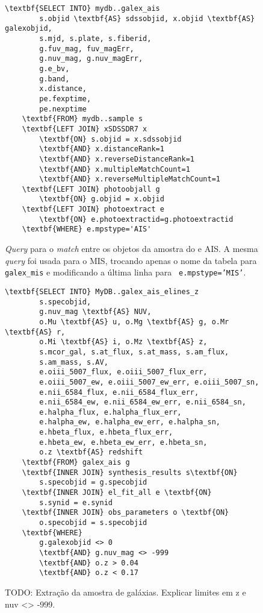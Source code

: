 \begin{figure}
	\begin{Verbatim}[commandchars=\\\{\}]
	\textbf{SELECT INTO} mydb..galex_ais
		s.objid \textbf{AS} sdssobjid, x.objid \textbf{AS} galexobjid,
		s.mjd, s.plate, s.fiberid,
		g.fuv_mag, fuv_magErr,
		g.nuv_mag, g.nuv_magErr,
		g.e_bv,
		g.band,
		x.distance,
		pe.fexptime,
		pe.nexptime
	\textbf{FROM} mydb..sample s
	\textbf{LEFT JOIN} xSDSSDR7 x
		\textbf{ON} s.objid = x.sdssobjid
		\textbf{AND} x.distanceRank=1
		\textbf{AND} x.reverseDistanceRank=1
		\textbf{AND} x.multipleMatchCount=1
		\textbf{AND} x.reverseMultipleMatchCount=1
	\textbf{LEFT JOIN} photoobjall g
		\textbf{ON} g.objid = x.objid
	\textbf{LEFT JOIN} photoextract e
		\textbf{ON} e.photoextractid=g.photoextractid
	\textbf{WHERE} e.mpstype='AIS'
	\end{Verbatim}
	\caption[{\em Match} entre os objetos da amostra do \starlight e \galex.]
	{{\em Query} para o {\em match} entre os objetos da amostra do \starlight e
	\galex AIS. A mesma {\em query} foi usada para o MIS, trocando apenas o nome da
	tabela para {\tt galex\_mis} e modificando a última linha para {\tt
	e.mpstype='MIS'}.}
	\label{fig:QueryMatchAIS}
\end{figure}

\begin{figure}
	\begin{Verbatim}[commandchars=\\\{\}]
	\textbf{SELECT INTO} MyDB..galex_ais_elines_z
		s.specobjid,
		g.nuv_mag \textbf{AS} NUV,
		o.Mu \textbf{AS} u, o.Mg \textbf{AS} g, o.Mr \textbf{AS} r,
		o.Mi \textbf{AS} i, o.Mz \textbf{AS} z,
		s.mcor_gal, s.at_flux, s.at_mass, s.am_flux,
		s.am_mass, s.AV,
		e.oiii_5007_flux, e.oiii_5007_flux_err,
		e.oiii_5007_ew, e.oiii_5007_ew_err, e.oiii_5007_sn,
		e.nii_6584_flux, e.nii_6584_flux_err,
		e.nii_6584_ew, e.nii_6584_ew_err, e.nii_6584_sn,
		e.halpha_flux, e.halpha_flux_err,
		e.halpha_ew, e.halpha_ew_err, e.halpha_sn,
		e.hbeta_flux, e.hbeta_flux_err,
		e.hbeta_ew, e.hbeta_ew_err, e.hbeta_sn,
		o.z \textbf{AS} redshift
	\textbf{FROM} galex_ais g
	\textbf{INNER JOIN} synthesis_results s\textbf{ON}
		s.specobjid = g.specobjid
	\textbf{INNER JOIN} el_fit_all e \textbf{ON}
		s.synid = e.synid
	\textbf{INNER JOIN} obs_parameters o \textbf{ON}
		o.specobjid = s.specobjid
	\textbf{WHERE}
		g.galexobjid <> 0
		\textbf{AND} g.nuv_mag <> -999
		\textbf{AND} o.z > 0.04
		\textbf{AND} o.z < 0.17
	\end{Verbatim}
	\caption[Extração da amostra de galáxias.]
	{TODO: Extração da amostra de galáxias. Explicar limites em z e nuv <> -999.}
	\label{fig:QuerySampleAIS}
\end{figure}


